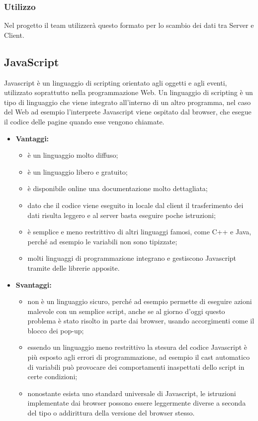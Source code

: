 	\subsubsection{Utilizzo}
	Nel progetto il team utilizzerà questo formato per lo scambio dei dati tra Server e Client.

\subsection{JavaScript}

	Javascript è un linguaggio di scripting orientato agli oggetti e agli eventi, utilizzato soprattutto nella programmazione Web. Un linguaggio di scripting è un tipo di linguaggio che viene integrato all'interno di un altro programma, nel caso del Web ad esempio l'interprete Javascript viene ospitato dal browser, che esegue il codice delle pagine quando esse vengono chiamate.		

	\begin{itemize}
		\item \textbf{Vantaggi:}
			\begin{itemize}
				\item è un linguaggio molto diffuso;
				\item è un linguaggio libero e gratuito;
				\item è disponibile online una documentazione molto dettagliata;
				\item dato che il codice viene eseguito in locale dal client il trasferimento dei dati risulta leggero e al server basta eseguire poche istruzioni;
				\item è semplice e meno restrittivo di altri linguaggi famosi, come C++ e Java, perché ad esempio le variabili non sono tipizzate;
				\item molti linguaggi di programmazione integrano e gestiscono Javascript tramite delle librerie apposite.
			\end{itemize}
		\item \textbf{Svantaggi:}
			\begin{itemize}
				\item non è un linguaggio sicuro, perché ad esempio permette di eseguire azioni malevole con un semplice script, anche se al giorno d'oggi questo problema è stato risolto in parte dai browser, usando accorgimenti come il blocco dei pop-up;
				\item essendo un linguaggio meno restrittivo la stesura del codice Javascript è più esposto agli errori di programmazione, ad esempio il cast automatico di variabili può provocare dei comportamenti inaspettati dello script in certe condizioni;
				\item nonostante esista uno standard universale di Javascript, le istruzioni implementate dai browser possono essere leggermente diverse a seconda del tipo o addirittura della versione del browser stesso.
			\end{itemize}
	\end{itemize}
